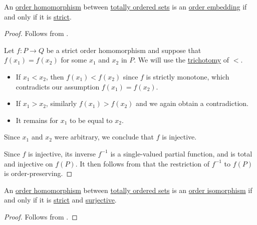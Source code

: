 \begin{proposition}\label{thm:total_order_embedding_iff_strict}
  An \hyperref[def:order_homomorphism/increasing]{order homomorphism} between \hyperref[def:totally_ordered_set]{totally ordered sets} is an \hyperref[def:order_homomorphism/embedding]{order embedding} if and only if it is \hyperref[def:order_homomorphism/increasing]{strict}.
\end{proposition}
\begin{proof}
  \SufficiencySubProof Follows from .

  \NecessitySubProof
   Let \( f: P \to Q \) be a strict order homomorphism and suppose that \( f(x_1) = f(x_2) \) for some \( x_1 \) and \( x_2 \) in \( P \). We will use the \hyperref[def:binary_relation/trichotomic]{trichotomy} of \( < \).
  \begin{itemize}
    \item If \( x_1 < x_2 \), then \( f(x_1) < f(x_2) \) since \( f \) is strictly monotone, which contradicts our assumption \( f(x_1) = f(x_2) \).

    \item If \( x_1 > x_2 \), similarly \( f(x_1) > f(x_2) \) and we again obtain a contradiction.

    \item It remains for \( x_1 \) to be equal to \( x_2 \).
  \end{itemize}

  Since \( x_1 \) and \( x_2 \) were arbitrary, we conclude that \( f \) is injective.

   Since \( f \) is injective, its inverse \( f^{-1} \) is a single-valued partial function, and is total and injective on \( f(P) \). It then follows from  that the restriction of \( f^{-1} \) to \( f(P) \) is order-preserving.
\end{proof}

\begin{corollary}\label{thm:totally_ordered_strict_isomorphisms}
  An \hyperref[def:order_homomorphism/increasing]{order homomorphism} between \hyperref[def:totally_ordered_set]{totally ordered sets} is an \hyperref[def:order_homomorphism/embedding]{order isomorphism} if and only if it is \hyperref[def:order_homomorphism/increasing]{strict} and \hyperref[def:function_invertibility/surjective]{surjective}.
\end{corollary}
\begin{proof}
  Follows from .
\end{proof}

